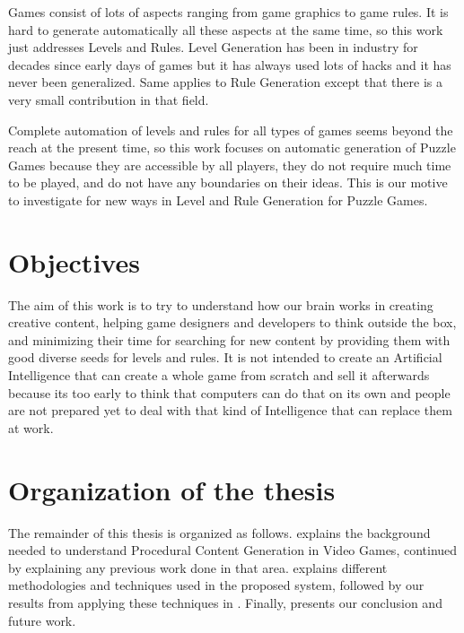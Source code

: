 Games consist of lots of aspects ranging from game graphics to game rules. It is hard to generate automatically all these aspects at the same time, so this work just addresses Levels and Rules. Level Generation has been in industry for decades since early days of games \cite{pcgFirstGame} but it has always used lots of hacks and it has never been generalized. Same applies to Rule Generation except that there is a very small contribution in that field.\\\par

Complete automation of levels and rules for all types of games seems beyond the reach at the present time, so this work focuses on automatic generation of Puzzle Games because they are accessible by all players, they do not require much time to be played, and do not have any boundaries on their ideas. This is our motive to investigate for new ways in Level and Rule Generation for Puzzle Games.

\section{Objectives}
The aim of this work is to try to understand how our brain works in creating creative content, helping game designers and developers to think outside the box, and minimizing their time for searching for new content by providing them with good diverse seeds for levels and rules. It is not intended to create an Artificial Intelligence that can create a whole game from scratch and sell it afterwards because its too early to think that computers can do that on its own and people are not prepared yet to deal with that kind of Intelligence that can replace them at work.


\section{Organization of the thesis}
The remainder of this thesis is organized as follows.  explains the background needed to understand Procedural Content Generation in Video Games, continued by  explaining any previous work done in that area.  explains different methodologies and techniques used in the proposed system, followed by our results from applying these techniques in . Finally,  presents our conclusion and future work.